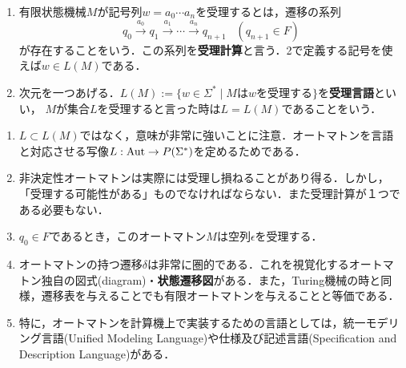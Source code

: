 \documentclass[uplatex, dvipdfmx]{jsreport}
\begin{document}
\begin{definition}\mbox{}
    \begin{enumerate}
        \item 有限状態機械$M$が記号列$w=a_0\cdots a_n$を受理するとは，遷移の系列
        \[ q_0\xrightarrow{a_0}q_1\xrightarrow{a_1}\cdots\xrightarrow{a_n}q_{n+1}\;\;\;(q_{n+1}\in F) \]
        が存在することをいう．この系列を\textbf{受理計算}と言う．2で定義する記号を使えば$w\in L(M)$である．
        \item 次元を一つあげる．$L(M):=\{w\in\Sigma^*\mid Mはwを受理する\}$を\textbf{受理言語}といい，
        $M$が集合$L$を受理すると言った時は$L=L(M)$であることをいう．
    \end{enumerate}
\end{definition}

\begin{remark}\mbox{}
    \begin{enumerate}
        \item $L\subset L(M)$ではなく，意味が非常に強いことに注意．オートマトンを言語と対応させる写像$L:\mathrm{Aut}\to P(\Sigma^*)$を定めるためである．
        \item 非決定性オートマトンは実際には受理し損ねることがあり得る．しかし，「受理する可能性がある」ものでなければならない．また受理計算が１つである必要もない．
        \item $q_0\in F$であるとき，このオートマトン$M$は空列$\epsilon$を受理する．
        \item オートマトンの持つ遷移$\delta$は非常に圏的である．これを視覚化するオートマトン独自の図式(diagram)・\textbf{状態遷移図}がある．また，Turing機械の時と同様，遷移表を与えることでも有限オートマトンを与えることと等価である．
        \item 特に，オートマトンを計算機上で実装するための言語としては，統一モデリング言語(Unified Modeling Language)や仕様及び記述言語(Specification and Description Language)がある．
    \end{enumerate}
\end{remark}
\end{document}
